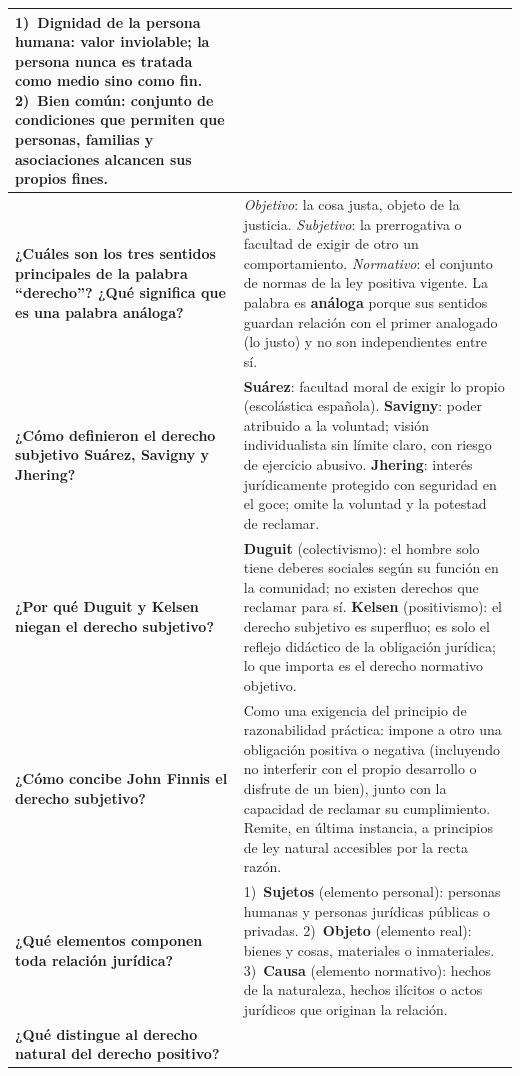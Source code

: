 \documentclass[12pt, a4paper]{report}
\begin{document}
{\begin{longtable}{|L{5.2cm}|L{9.8cm}|}
1)~\textbf{Dignidad de la persona humana}: valor inviolable; la persona
nunca es tratada como medio sino como fin. 2)~\textbf{Bien común}: conjunto
de condiciones que permiten que personas, familias y asociaciones alcancen
sus propios fines. \\
\hline
\textbf{¿Cuáles son los tres sentidos principales de la palabra ``derecho''?
¿Qué significa que es una palabra análoga?} &
\textit{Objetivo}: la cosa justa, objeto de la justicia. \textit{Subjetivo}:
la prerrogativa o facultad de exigir de otro un comportamiento.
\textit{Normativo}: el conjunto de normas de la ley positiva vigente. La
palabra es \textbf{análoga} porque sus sentidos guardan relación con el
primer analogado (lo justo) y no son independientes entre sí. \\
\hline
\textbf{¿Cómo definieron el derecho subjetivo Suárez, Savigny y Jhering?} &
\textbf{Suárez}: facultad moral de exigir lo propio (escolástica española).
\textbf{Savigny}: poder atribuido a la voluntad; visión individualista sin
límite claro, con riesgo de ejercicio abusivo. \textbf{Jhering}: interés
jurídicamente protegido con seguridad en el goce; omite la voluntad y la
potestad de reclamar. \\
\hline
\textbf{¿Por qué Duguit y Kelsen niegan el derecho subjetivo?} &
\textbf{Duguit} (colectivismo): el hombre solo tiene deberes sociales según
su función en la comunidad; no existen derechos que reclamar para sí.
\textbf{Kelsen} (positivismo): el derecho subjetivo es superfluo; es solo
el reflejo didáctico de la obligación jurídica; lo que importa es el
derecho normativo objetivo. \\
\hline
\textbf{¿Cómo concibe John Finnis el derecho subjetivo?} &
Como una exigencia del principio de razonabilidad práctica: impone a otro
una obligación positiva o negativa (incluyendo no interferir con el propio
desarrollo o disfrute de un bien), junto con la capacidad de reclamar su
cumplimiento. Remite, en última instancia, a principios de ley natural
accesibles por la recta razón. \\
\hline
\textbf{¿Qué elementos componen toda relación jurídica?} &
1)~\textbf{Sujetos} (elemento personal): personas humanas y personas
jurídicas públicas o privadas. 2)~\textbf{Objeto} (elemento real): bienes
y cosas, materiales o inmateriales. 3)~\textbf{Causa} (elemento normativo):
hechos de la naturaleza, hechos ilícitos o actos jurídicos que originan la
relación. \\
\hline
\textbf{¿Qué distingue al derecho natural del derecho positivo?} &

\end{longtable}}
\end{document}
